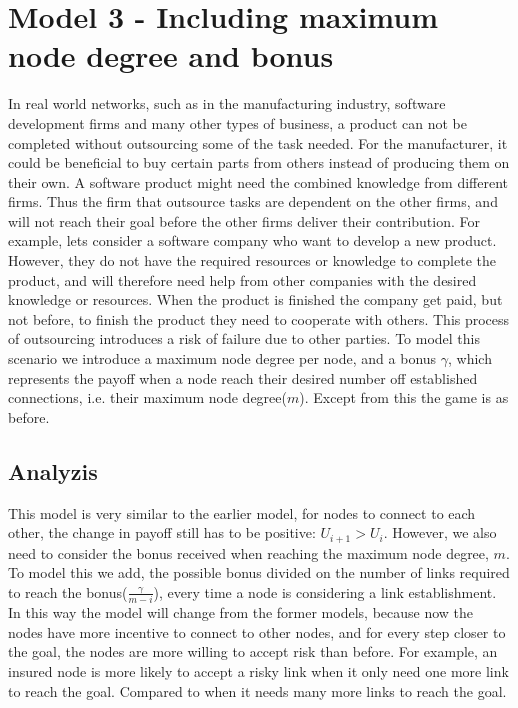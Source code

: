 %


\section{Model 3 - Including maximum node degree and bonus}
In real world networks, such as in the manufacturing industry, software development firms and many other types of business, a product can not be completed without outsourcing some of the task needed. For the manufacturer, it could be beneficial to buy certain parts from others instead of producing them on their own. A software product might need the combined knowledge from different firms. Thus the firm that outsource tasks are dependent on the other firms, and will not reach their goal before the other firms deliver their contribution. 
For example, lets consider a software company who want to develop a new product. However, they do not have the required resources or knowledge to complete the product, and will therefore need help from other companies with the desired knowledge or resources. When the product is finished the company get paid, but not before, to finish the product they need to cooperate with others.
This process of outsourcing introduces a risk of failure due to other parties. To model this scenario we introduce a maximum node degree per node, and a bonus $\gamma$, which represents the payoff when a node reach their desired number off established connections, i.e. their maximum node degree($m$).
Except from this the game is as before.
\subsection{Analyzis}
This model is very similar to the earlier model, for nodes to connect to each other, the change in payoff still has to be positive: $U_{i+1} > U_{i}$. However, we also need to consider the bonus received when reaching the maximum node degree, $m$. 
To model this we add, the possible bonus divided on the number of links required to reach the bonus($\frac{\gamma}{m-i}$), every time a node is considering a link establishment. 
In this way the model will change from the former models, because now the nodes have more incentive to connect to other nodes, and for every step closer to the goal, the nodes are more willing to accept risk than before. For example, an insured node is more likely to accept a risky link when it only need one more link to reach the goal. Compared to when it needs many more links to reach the goal.

